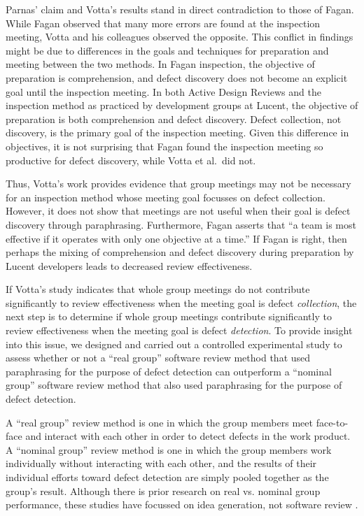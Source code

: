 Parnas' claim and Votta's results stand in direct contradiction to those of
Fagan.  While Fagan observed that many more errors are found at the
inspection meeting, Votta and his colleagues observed the opposite.  This
conflict in findings might be due to differences in the goals and
techniques for preparation and meeting between the two methods.  In Fagan
inspection, the objective of preparation is comprehension, and defect
discovery does not become an explicit goal until the inspection meeting. In
both Active Design Reviews and the inspection method as practiced by
development groups at Lucent, the objective of preparation is both
comprehension and defect discovery. Defect collection, not discovery, is
the primary goal of the inspection meeting.  Given this difference in
objectives, it is not surprising that Fagan found the inspection meeting so
productive for defect discovery, while Votta et al.~did not.

Thus, Votta's work provides evidence that group meetings may not be
necessary for an inspection method whose meeting goal focusses on defect
collection. However, it does not show that meetings are not useful when
their goal is defect discovery through paraphrasing. Furthermore, Fagan
asserts that ``a team is most effective if it operates with only one
objective at a time.''  If Fagan is right, then perhaps the mixing of
comprehension and defect discovery during preparation by Lucent
developers leads to decreased review effectiveness.

If Votta's study indicates that whole group meetings do not contribute
significantly to review effectiveness when the meeting goal is defect {\em
  collection}, the next step is to determine if whole group meetings
contribute significantly to review effectiveness when the meeting goal is
defect {\em detection}.  To provide insight into this issue, we designed
and carried out a controlled experimental study to assess whether or not a
``real group'' software review method that used paraphrasing for the
purpose of defect detection can outperform a ``nominal group'' software
review method that also used paraphrasing for the purpose of defect
detection.  

A ``real group'' review method is one in which the group members meet
face-to-face and interact with each other in order to detect defects in the
work product. A ``nominal group'' review method is one in which the group
members work individually without interacting with each other, and the
results of their individual efforts toward defect detection are simply
pooled together as the group's result.  Although there is prior research on
real vs. nominal group performance, these studies have focussed on idea
generation, not software review \cite{Diehl87,Mullen91}.

